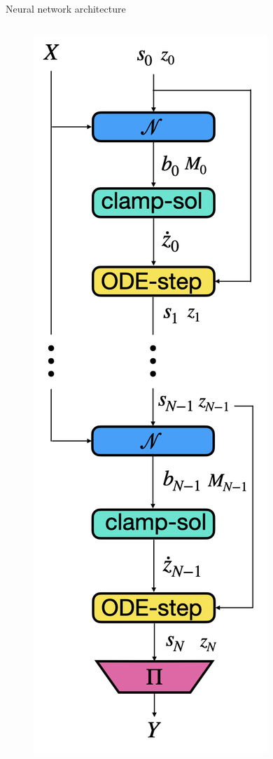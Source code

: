 \documentclass[final]{beamer}
\newlength{\lrcolwidth}
\begin{document}
\begin{frame}[t]
\begin{columns}[t]
\begin{column}{\lrcolwidth}
\begin{block}{Neural network architecture}
\begin{columns}
\begin{column}{0.3\textwidth}

        \begin{figure}[t]
          \centering
          \includegraphics[width=0.8\linewidth]{images/architecture_vert.001.png}         
        \end{figure}
      \end{column}
    \end{columns}


\end{block}
\end{column}
\end{columns}
\end{frame}
\end{document}
